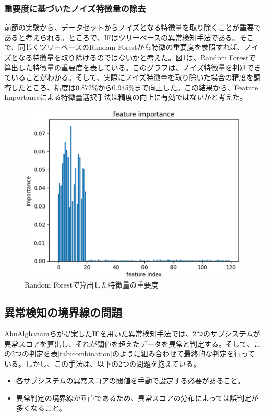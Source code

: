 \documentclass{css}
\begin{document}
\subsubsection{重要度に基づいたノイズ特徴量の除去}
前節の実験から、データセットからノイズとなる特徴量を取り除くことが重要であると考えられる。ところで、IFはツリーベースの異常検知手法である。そこで、同じくツリーベースのRandam Forestから特徴の重要度を参照すれば、ノイズとなる特徴量を取り除けるのではないかと考えた。図\ref{fig:select_noise}は、Random Forestで算出した特徴量の重要度を表している。このグラフは、ノイズ特徴量を判別できていることがわかる。そして、実際にノイズ特徴量を取り除いた場合の精度を調査したところ、精度は0.872\%から0.945\%まで向上した。この結果から、Feature Importanceによる特徴量選択手法は精度の向上に有効ではないかと考えた。

\begin{figure}[ht]
    \centering
    \includegraphics[width=0.9\linewidth]{pictures/eps/select_noise.eps}
    \caption{Random Forestで算出した特徴量の重要度}
    \label{fig:select_noise}
\end{figure}

\subsection{異常検知の境界線の問題}
AbuAlghanamらが提案したIFを用いた異常検知手法\cite{AbuAlghanam2023-sx}では、2つのサブシステムが異常スコアを算出し、それが閾値を超えたデータを異常と判定する。そして、この2つの判定を表\ref{tab:combination}のように組み合わせて最終的な判定を行っている。しかし、この手法は、以下の2つの問題を抱えている。

\begin{itemize}
    \item 各サブシステムの異常スコアの閾値を手動で設定する必要があること。
    \item 異常判定の境界線が垂直であるため、異常スコアの分布によっては誤判定が多くなること。
\end{itemize}
\end{document}
